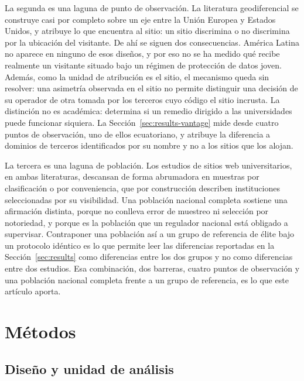 \documentclass[pdflatex,sn-basic,Numbered,iicol]{sn-jnl}
\theoremstyle{thmstyleone}
\theoremstyle{thmstyletwo}
\theoremstyle{thmstylethree}
\begin{document}
La segunda es una laguna de punto de observaci\'on. La literatura geodiferencial se construye casi por completo sobre un eje entre la Uni\'on Europea y Estados Unidos, y atribuye lo que encuentra al sitio: un sitio discrimina o no discrimina por la ubicaci\'on del visitante. De ah\'i se siguen dos consecuencias. Am\'erica Latina no aparece en ninguno de esos dise\~nos, y por eso no se ha medido qu\'e recibe realmente un visitante situado bajo un r\'egimen de protecci\'on de datos joven. Adem\'as, como la unidad de atribuci\'on es el sitio, el mecanismo queda sin resolver: una asimetr\'ia observada en el sitio no permite distinguir una decisi\'on de su operador de otra tomada por los terceros cuyo c\'odigo el sitio incrusta. La distinci\'on no es acad\'emica: determina si un remedio dirigido a las universidades puede funcionar siquiera. La Secci\'on~\ref{sec:results-vantage} mide desde cuatro puntos de observaci\'on, uno de ellos ecuatoriano, y atribuye la diferencia a dominios de terceros identificados por su nombre y no a los sitios que los alojan.

La tercera es una laguna de poblaci\'on. Los estudios de sitios web universitarios, en ambas literaturas, descansan de forma abrumadora en muestras por clasificaci\'on o por conveniencia, que por construcci\'on describen instituciones seleccionadas por su visibilidad. Una poblaci\'on nacional completa sostiene una afirmaci\'on distinta, porque no conlleva error de muestreo ni selecci\'on por notoriedad, y porque es la poblaci\'on que un regulador nacional est\'a obligado a supervisar. Contraponer una poblaci\'on as\'i a un grupo de referencia de \'elite bajo un protocolo id\'entico es lo que permite leer las diferencias reportadas en la Secci\'on~\ref{sec:results} como diferencias entre los dos grupos y no como diferencias entre dos estudios. Esa combinaci\'on, dos barreras, cuatro puntos de observaci\'on y una poblaci\'on nacional completa frente a un grupo de referencia, es lo que este art\'iculo aporta.

\section{M\'etodos}\label{sec:methods}

\subsection{Dise\~no y unidad de an\'alisis}\label{sec:methods-design}
\end{document}
